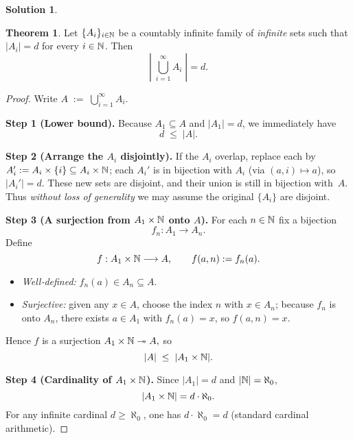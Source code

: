 \documentclass[12pt]{article}
\theoremstyle{definition} %
\newtheorem{solution}{Solution}
\newtheorem{theorem}{Theorem}
\theoremstyle{plain} %
\begin{document}
    \begin{solution}
      \begin{theorem}
        Let $\{A_i\}_{i\in\Bbb N}$ be a countably infinite family of
        \emph{infinite} sets such that
        \(
           \lvert A_i\rvert = d
        \)
        for every $i\in\Bbb N$.
        Then
        \[
           \left\lvert\;\bigcup_{i=1}^{\infty} A_i\;\right\rvert = d .
        \]
        \end{theorem}
        
        \begin{proof}
        Write
        \(
          A \;:=\; \bigcup_{i=1}^{\infty} A_i.
        \)
        
        \medskip
        \textbf{Step 1 (Lower bound).}
        Because $A_1\subseteq A$ and
        $\lvert A_1\rvert=d$, we immediately have
        \[
           d \;\le\; \lvert A\rvert.
        \]
        
        \medskip
        \textbf{Step 2 (Arrange the $A_i$ disjointly).}
        If the $A_i$ overlap, replace each by
        \(
          A_i' := A_i\times\{i\}\subseteq A_i\times\Bbb N
        \);
        each $A_i'$ is in bijection with $A_i$
        (via $(a,i)\mapsto a$), so $\lvert A_i'\rvert=d$.
        These new sets are disjoint, and their union is still
        in bijection with~$A$.
        Thus \emph{without loss of generality} we may assume the original
        $\{A_i\}$ are disjoint.
        
        \medskip
        \textbf{Step 3 (A surjection from $A_1\times\Bbb N$ onto $A$).}
        For each $n\in\Bbb N$ fix a bijection
        \[
          f_n:A_1\longrightarrow A_n.
        \]
        Define
        \[
          f:A_1\times\Bbb N\longrightarrow A,
          \qquad
          f(a,n) := f_n(a).
        \]
        \begin{itemize}
          \item \emph{Well‑defined:} $f_n(a)\in A_n\subseteq A$.
          \item \emph{Surjective:} given any $x\in A$, choose the index
                $n$ with $x\in A_n$; because $f_n$ is onto $A_n$,
                there exists $a\in A_1$ with $f_n(a)=x$, so $f(a,n)=x$.
        \end{itemize}
        Hence $f$ is a surjection
        \(
          A_1\times\Bbb N \twoheadrightarrow A,
        \)
        so
        \[
           \lvert A\rvert \;\le\; \lvert A_1\times\Bbb N\rvert.
        \]
        
        \medskip
        \textbf{Step 4 (Cardinality of $A_1\times\Bbb N$).}
        Since $\lvert A_1\rvert=d$ and $\lvert\Bbb N\rvert=\aleph_0$,
        \[
          \lvert A_1\times\Bbb N\rvert = d\cdot\aleph_0.
        \]
        For any infinite cardinal $d\ge\aleph_0$,
        one has $d\cdot\aleph_0 = d$ (standard cardinal arithmetic).
        

\end{proof}
\end{solution}
\end{document}
